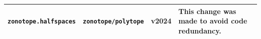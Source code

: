 \begin{table}
{\begin{tabular}{ l l l p{8cm} }
            \texttt{zonotope.halfspaces}     & \texttt{zonotope/polytope}         & v2024          & This change was made to avoid code redundancy.                                                                                                                                                                                                                             \\
            \bottomrule
        \end{tabular}
    }
\end{table}
